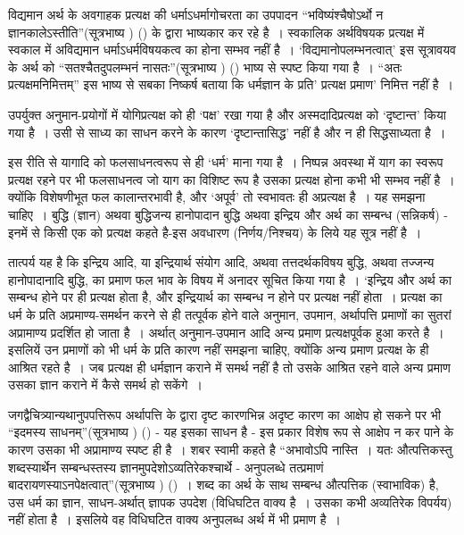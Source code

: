 विद्यमान अर्थ के अवगाहक प्रत्यक्ष की धर्माऽधर्मागोचरता का उपपादन “भविष्यंश्चैषोऽर्थो न ज्ञानकालेऽस्तीति”(सूत्रभाष्य ) () के द्वारा भाष्यकार कर रहे है~। स्वकालिक अर्थविषयक प्रत्यक्ष में स्वकाल में अविद्यमान धर्माऽधर्मविषयकत्व का होना सम्भव नहीं है~। ‘विद्यमानोपलम्भनत्वात्' इस सूत्रावयव के अर्थ को “सतश्चैतदुपलम्भनं नासतः”(सूत्रभाष्य ) () भाष्य से स्पष्ट किया गया है~। “अतः प्रत्यक्षमनिमित्तम्” इस भाष्य से सबका निष्कर्ष बताया कि धर्मज्ञान के प्रति' प्रत्यक्ष प्रमाण' निमित्त नहीं है~।

उपर्युक्त अनुमान-प्रयोगों में योगिप्रत्यक्ष को ही ‘पक्ष' रखा गया है और अस्मदादिप्रत्यक्ष को ‘दृष्टान्त' किया गया है~। उसी से साध्य का साधन करने के कारण ‘दृष्टान्तासिद्ध' नहीं है और न ही सिद्धसाध्यता है~।

इस रीति से यागादि को फलसाधनत्वरूप से ही ‘धर्म' माना गया है~। निष्पन्न अवस्था में याग का स्वरूप प्रत्यक्ष रहने पर भी फलसाधनत्व जो याग का विशिष्ट रूप है उसका प्रत्यक्ष होना कभी भी सम्भव नहीं है~। क्योंकि विशेषणीभूत फल कालान्तरभावी है, और ‘अपूर्व' तो स्वभावतः ही अप्रत्यक्ष है~। यह समझना चाहिए~। बुद्धि (ज्ञान) अथवा बुद्धिजन्य हानोपादान बुद्धि अथवा इन्द्रिय और अर्थ का सम्बन्ध (सन्निकर्ष) - इनमें से किसी एक को प्रत्यक्ष कहते है-इस अवधारण (निर्णय/निश्चय) के लिये यह सूत्र नहीं है~। 

तात्पर्य यह है कि इन्द्रिय आदि, या इन्द्रियार्थ संयोग आदि, अथवा तत्तदर्थकविषय बुद्धि, अथवा तज्जन्य हानोपादानादि बुद्धि, का प्रमाण फल भाव के विषय में अनादर सूचित किया गया है~। ‘इन्द्रिय और अर्थ का सम्बन्ध होने पर ही प्रत्यक्ष होता है, और इन्द्रियार्थ का सम्बन्ध न होने पर प्रत्यक्ष नहीं होता~। प्रत्यक्ष का धर्म के प्रति अप्रमाण्य-समर्थन करने से ही तत्पूर्वक होने वाले अनुमान, उपमान, अर्थापत्ति प्रमाणों का सुतरां अप्रामाण्य प्रदर्शित हो जाता है~। अर्थात् अनुमान-उपमान आदि अन्य प्रमाण प्रत्यक्षपूर्वक हुआ करते है~। इसलियें उन प्रमाणों को भी धर्म के प्रति कारण नहीं समझना चाहिए, क्योंकि अन्य प्रमाण प्रत्यक्ष के ही आश्रित रहते है~। जब प्रत्यक्ष ही धर्मज्ञान कराने में समर्थ नहीं है तो उसके आश्रित रहने वाले अन्य प्रमाण उसका ज्ञान कराने में कैसे समर्थ हो सकेंगे~। 

जगद्वैचित्र्यान्यथानुपपत्तिरूप अर्थापत्ति के द्वारा दृष्ट कारणभिन्न अदृष्ट कारण का आक्षेप हो सकने पर भी “इदमस्य साधनम्”(सूत्रभाष्य ) () - यह इसका साधन है - इस प्रकार विशेष रूप से आक्षेप न कर पाने के कारण उसका भी अप्रामाण्य स्पष्ट ही है~। शबर स्वामी कहते है “अभावोऽपि नास्ति~। यतः औत्पत्तिकस्तु शब्दस्यार्थेन सम्बन्धस्तस्य ज्ञानमुपदेशोऽव्यतिरेकश्चार्थे - अनुपलब्धे तत्प्रमाणं बादरायणस्याऽनपेक्षत्वात्”(सूत्रभाष्य ) ()~। शब्द का अर्थ के साथ सम्बन्ध औत्पत्तिक (स्वाभाविक) है, उस धर्म का ज्ञान, साधन-अर्थात् ज्ञापक उपदेश (विधिघटित वाक्य है~। उसका कभी अव्यतिरेक विपर्यय) नहीं होता है~। इसलिये वह विधिघटित वाक्य अनुपलब्ध अर्थ में भी प्रमाण है~।

